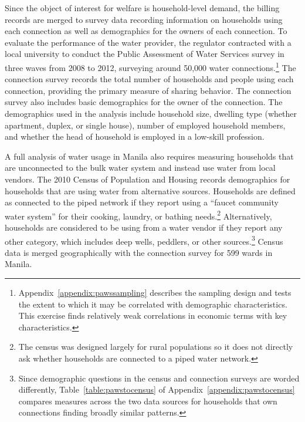 \documentclass[12pt]{article}
\begin{document}
Since the object of interest for welfare is household-level demand, the billing records are merged to survey data recording information on households using each connection as well as demographics for the owners of each connection.  To evaluate the performance of the water provider, the regulator contracted with a local university to conduct the Public Assessment of Water Services survey in three waves from 2008 to 2012, surveying around 50,000 water connections.\footnote{Appendix~\ref{appendix:pawssampling} describes the sampling design and tests the extent to which it may be correlated with demographic characteristics.  This exercise finds relatively weak correlations in economic terms with key characteristics.}  The connection survey records the total number of households and people using each connection, providing the primary measure of sharing behavior.  The connection survey also includes basic demographics for the owner of the connection.  The demographics used in the analysis include household size, dwelling type (whether apartment, duplex, or single house), number of employed household members, and whether the head of household is employed in a low-skill profession.

A full analysis of water usage in Manila also requires measuring households that are unconnected to the bulk water system and instead use water from local vendors.  The 2010 Census of Population and Housing records demographics for households that are using water from alternative sources.  Households are defined as connected to the piped network if they report using a ``faucet community water system'' for their cooking, laundry, or bathing needs.\footnote{The census was designed largely for rural populations so it does not directly ask whether households are connected to a piped water network.}  Alternatively, households are considered to be using from a water vendor if they report any other category, which includes deep wells, peddlers, or other sources.\footnote{Since demographic questions in the census and connection surveys are worded differently, Table~\ref{table:pawstocensus} of Appendix~\ref{appendix:pawstocensus} compares measures across the two data sources for households that own connections finding broadly similar patterns.}  Census data is merged geographically with the connection survey for 599 wards in Manila.
\end{document}
